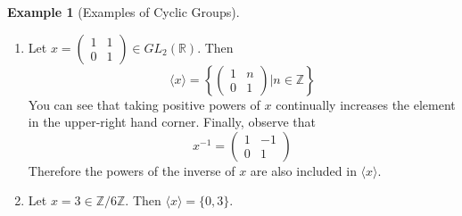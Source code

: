 \documentclass[12pt]{article}
\theoremstyle{definition}
\newtheorem{example}{\color{WildStrawberry}Example}
\theoremstyle{definition}
\begin{document}
\begin{example}[Examples of Cyclic Groups]
\begin{enumerate}
	\item Let $x = \begin{pmatrix} 1 & 1 \\ 0 & 1 \end{pmatrix} \in GL_2(\mathbb{R})$. Then
	\begin{equation}
		\langle x \rangle = \left\{ \begin{pmatrix} 1 & n \\ 0 & 1 \end{pmatrix} \Big\vert n \in \mathbb{Z} \right\}
	\end{equation}
	You can see that taking positive powers of $x$ continually increases the element in the upper-right hand corner. Finally, observe that 
	\begin{equation}
		x^{-1} = \begin{pmatrix} 1 & -1 \\ 0 & 1 \end{pmatrix}
	\end{equation}
	Therefore the powers of the inverse of $x$ are also included in $\langle x \rangle$.
	\item Let $x = 3 \in \mathbb{Z} / 6 \mathbb{Z}$. Then $\langle x \rangle = \{ 0, 3 \}$.
\end{enumerate}
\end{example}
\end{document}
